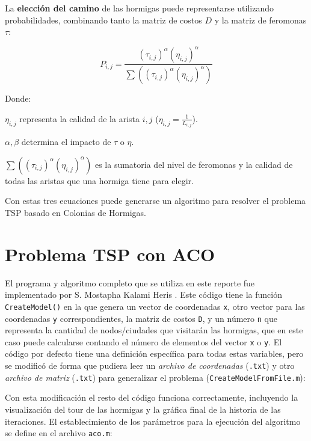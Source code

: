 \documentclass[12pt, a4paper]{article}
\begin{document}
La \textbf{elección del camino} de las hormigas puede representarse utilizando probabilidades, combinando tanto la matriz de costos $D$ y la matriz de feromonas $\tau$:

\begin{equation}
    P_{i,j}=\frac{(\tau_{i,j})^\alpha(\eta_{i,j})^\alpha}{\sum((\tau_{i,j})^\alpha(\eta_{i,j})^\alpha)}
\end{equation}

Donde:

$\eta_{i,j}$ representa la calidad de la arista $i,j$ ($\eta_{i,j}=\frac{1}{L_{i,j}}$).

$\alpha,\beta$ determina el impacto de $\tau$ o $\eta$.

$\sum((\tau_{i,j})^\alpha(\eta_{i,j})^\alpha)$ es la sumatoria del nivel de feromonas y la calidad de todas las aristas que una hormiga tiene para elegir.

Con estas tres ecuaciones puede generarse un algoritmo para resolver el problema TSP basado en Colonias de Hormigas.

\section{Problema TSP con ACO}
El programa y algoritmo completo que se utiliza en este reporte fue implementado por S. Mostapha Kalami Heris \cite{AntColon50:online}. Este código tiene la función \lstinline{CreateModel()} en la que genera un vector de coordenadas \lstinline{x}, otro vector para las coordenadas \lstinline{y} correspondientes, la matriz de costos \lstinline{D}, y un número \lstinline{n} que representa la cantidad de nodos/ciudades que visitarán las hormigas, que en este caso puede calcularse contando el número de elementos del vector \lstinline{x} o \lstinline{y}. El código por defecto tiene una definición específica para todas estas variables, pero se modificó de forma que pudiera leer un \emph{archivo de coordenadas} (\lstinline{.txt}) y otro \emph{archivo de matriz} (\lstinline{.txt}) para generalizar el problema (\lstinline{CreateModelFromFile.m}):



Con esta modificación el resto del código funciona correctamente, incluyendo la visualización del tour de las hormigas y la gráfica final de la historia de las iteraciones. El establecimiento de los parámetros para la ejecución del algoritmo se define en el archivo \lstinline{aco.m}:


\end{document}
